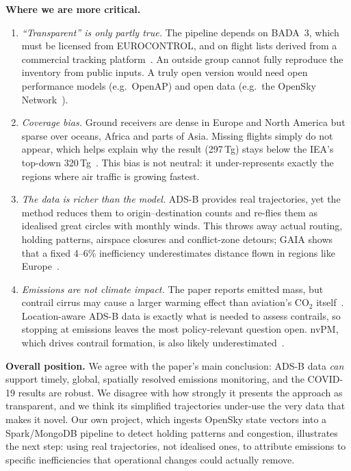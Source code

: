 \documentclass[11pt,a4paper]{article}
\begin{document}
\textbf{Where we are more critical.}
\begin{enumerate}
  \item \emph{``Transparent'' is only partly true.} The pipeline depends on BADA~3, which must be licensed from
  EUROCONTROL, and on flight lists derived from a commercial tracking platform~\cite{teoh2024}. An outside
  group cannot fully reproduce the inventory from public inputs. A truly open version would need open
  performance models (e.g.\ OpenAP) and open data (e.g.\ the OpenSky Network~\cite{schafer2014}).
  \item \emph{Coverage bias.} Ground receivers are dense in Europe and North America but sparse over oceans,
  Africa and parts of Asia. Missing flights simply do not appear, which helps explain why the result (297\,Tg)
  stays below the IEA's top-down 320\,Tg~\cite{teoh2024}. This bias is not neutral: it under-represents
  exactly the regions where air traffic is growing fastest.
  \item \emph{The data is richer than the model.} ADS-B provides real trajectories, yet the method reduces
  them to origin--destination counts and re-flies them as idealised great circles with monthly winds.
  This throws away actual routing, holding patterns, airspace closures and conflict-zone detours;
  GAIA shows that a fixed 4--6\% inefficiency underestimates distance flown in regions like Europe~\cite{teoh2024}.
  \item \emph{Emissions are not climate impact.} The paper reports emitted mass, but contrail cirrus may cause
  a larger warming effect than aviation's CO$_2$ itself~\cite{lee2021}. Location-aware ADS-B data is exactly what is
  needed to assess contrails, so stopping at emissions leaves the most policy-relevant question open.
  nvPM, which drives contrail formation, is also likely underestimated~\cite{teoh2024}.
\end{enumerate}

\textbf{Overall position.} We agree with the paper's main conclusion: ADS-B data \emph{can} support timely,
global, spatially resolved emissions monitoring, and the COVID-19 results are robust. We disagree with how
strongly it presents the approach as transparent, and we think its simplified trajectories under-use the very
data that makes it novel. Our own project, which ingests OpenSky state vectors into a Spark/MongoDB pipeline
to detect holding patterns and congestion, illustrates the next step: using real trajectories, not idealised
ones, to attribute emissions to specific inefficiencies that operational changes could actually remove.
\end{document}
